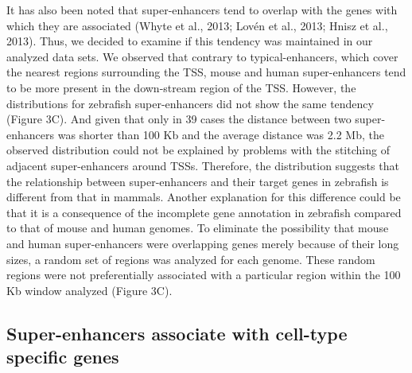 		It has also been noted that super-enhancers tend to overlap with the genes with which they are associated (Whyte et al., 2013; Lov\'en et al., 2013; Hnisz et al., 2013). Thus, we decided to examine if this tendency was maintained in our analyzed data sets. We observed that contrary to typical-enhancers, which cover the nearest regions surrounding the TSS, mouse and human super-enhancers tend to be more present in the down-stream region of the TSS. However, the distributions for zebrafish super-enhancers did not show the same tendency (Figure 3C). And given that only in 39 cases the distance between two super-enhancers was shorter than 100 Kb and the average distance was 2.2 Mb, the observed distribution could not be explained by problems with the stitching of adjacent super-enhancers around TSSs. Therefore, the distribution suggests that the relationship between super-enhancers and their target genes in zebrafish is different from that in mammals. Another explanation for this difference could be that it is a consequence of the incomplete gene annotation in zebrafish compared to that of mouse and human genomes. To eliminate the possibility that mouse and human super-enhancers were overlapping genes merely because of their long sizes, a random set of regions was analyzed for each genome. These random regions were not preferentially associated with a particular region within the 100 Kb window analyzed (Figure 3C).\\

	\subsection{Super-enhancers associate with cell-type specific genes}

